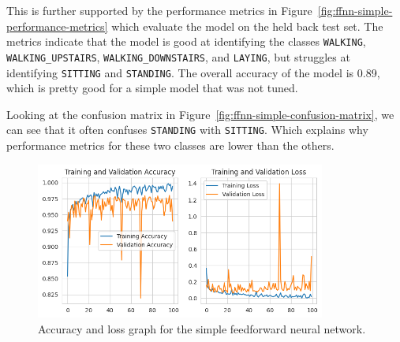 This is further supported by the performance metrics in Figure~\ref{fig:ffnn-simple-performance-metrics}
which evaluate the model on the held back test set.
The metrics indicate that the model is good at identifying the classes \texttt{WALKING},
\texttt{WALKING\_UPSTAIRS}, \texttt{WALKING\_DOWNSTAIRS},
and \texttt{LAYING}, but struggles at identifying \texttt{SITTING} and \texttt{STANDING}.
The overall accuracy of the model is 0.89, which is pretty good for a simple model that was not tuned.

Looking at the confusion matrix in Figure~\ref{fig:ffnn-simple-confusion-matrix},
we can see that it often confuses \texttt{STANDING} with \texttt{SITTING}.
Which explains why performance metrics for these two classes are lower than the others.

\begin{figure}[ht]
    \centering
    \includegraphics[width=0.85\textwidth]{./img/ffnn/simple/accuracy-loss-graph}
    \caption{Accuracy and loss graph for the simple feedforward neural network.}
    \label{fig:ffnn-simple-accuracy-loss-graph}
\end{figure}

